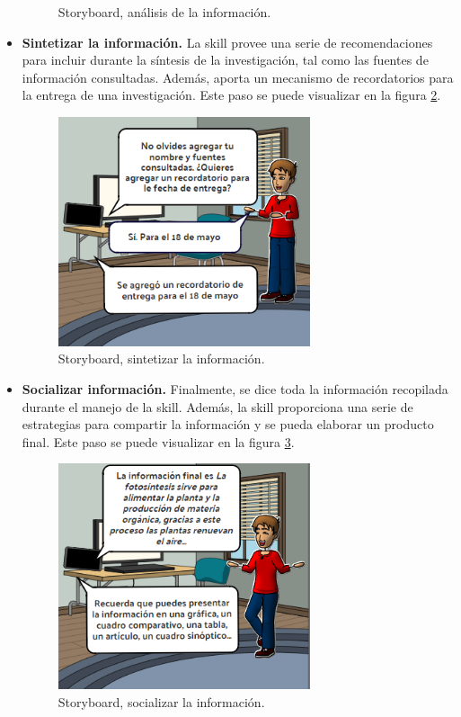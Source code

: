 \begin{itemize}
\begin{figure}
    \caption{Storyboard, análisis de la información.}
    \label{fig:419}
  \end{figure}
  \item \textbf{Sintetizar la información.} La skill provee una serie de recomendaciones para incluir durante la síntesis de la investigación, tal como las fuentes de información consultadas. Además, aporta un mecanismo de recordatorios para la entrega de una investigación. Este paso se puede visualizar en la figura \ref{fig:420}.
  \begin{figure}
    \centering
    \includegraphics[width=0.70\textwidth]{Cap4/Figuras/05.png}
    \caption{Storyboard, sintetizar la información.}
    \label{fig:420}
  \end{figure}
  \item \textbf{Socializar información.} Finalmente, se dice toda la información recopilada durante el manejo de la skill. Además, la skill proporciona una serie de estrategias para compartir la información y se pueda elaborar un producto final. Este paso se puede visualizar en la figura \ref{fig:421}.
  \begin{figure}
    \centering
    \includegraphics[width=0.70\textwidth]{Cap4/Figuras/06.png}
    \caption{Storyboard, socializar la información.}
    \label{fig:421}
  \end{figure}
\end{itemize}

